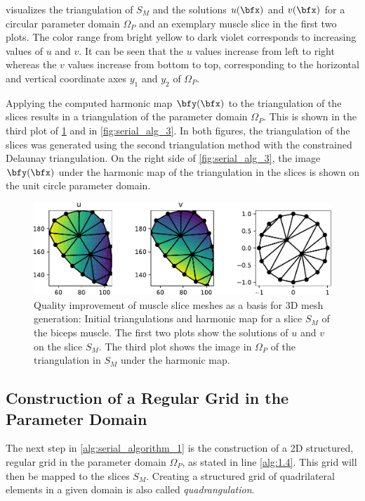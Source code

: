  visualizes the triangulation of $S_M$ and the solutions $u(\bfx)$ and $v(\bfx)$ for a circular parameter domain $\Omega_P$ and an exemplary muscle slice in the first two plots. The color range from bright yellow to dark violet corresponds to increasing values of $u$ and $v$. It can be seen that the $u$ values increase from left to right whereas the $v$ values increase from bottom to top, corresponding to the horizontal and vertical coordinate axes $y_1$ and $y_2$ of $\Omega_P$.


Applying the computed harmonic map $\bfy(\bfx)$ to the triangulation of the slices results in a triangulation of the parameter domain $\Omega_P$. This is shown in the third plot of \cref{fig:harmonic_map_solution0} and in \cref{fig:serial_alg_3}.
In both figures, the triangulation of the slices was generated using the second triangulation method with the constrained Delaunay triangulation. On the right side of \cref{fig:serial_alg_3}, the image $\bfy(\bfx)$ under the harmonic map of the triangulation in the slices is shown on the unit circle parameter domain.

\begin{figure}%
  \centering%
  \includegraphics[width=\textwidth]{images/fiber_creation/harmonic_map_9b.pdf}%
  \caption{Quality improvement of muscle slice meshes as a basis for 3D mesh generation: Initial triangulations and harmonic map for a slice $S_M$ of the biceps muscle. The first two plots show the solutions of $u$ and $v$ on the slice $S_M$. The third plot shows the image in $\Omega_P$ of the triangulation in $S_M$ under the harmonic map.}%
  \label{fig:harmonic_map_solution0}%
\end{figure}%

\subsection{Construction of a Regular Grid in the Parameter Domain}
The next step in \cref{alg:serial_algorithm_1} is the construction of a 2D structured, regular grid in the parameter domain $\Omega_P$, as stated in line \ref{alg:1.4}. This grid will then be mapped to the slices $S_M$. Creating a structured grid of quadrilateral elements in a given domain is also called \emph{quadrangulation}.

